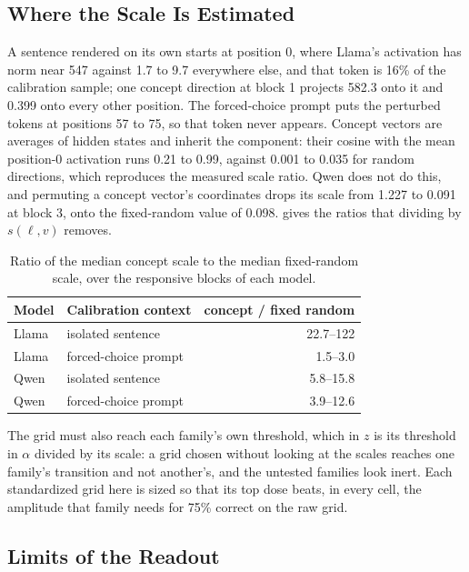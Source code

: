 \subsection{Where the Scale Is Estimated}
\label{app:loc-scale}

A sentence rendered on its own starts at position 0, where Llama's activation
has norm near 547 against 1.7 to 9.7 everywhere else, and that token is 16\%
of the calibration sample; one concept direction at block 1 projects 582.3
onto it and 0.399 onto every other position. The forced-choice prompt puts the
perturbed tokens at positions 57 to 75, so that token never appears. Concept
vectors are averages of hidden states and inherit the component: their cosine
with the mean position-0 activation runs 0.21 to 0.99, against 0.001 to 0.035
for random directions, which reproduces the measured scale ratio. Qwen does
not do this, and permuting a concept vector's coordinates drops its scale from
1.227 to 0.091 at block 3, onto the fixed-random value of 0.098.
 gives the ratios that dividing by $s(\ell,v)$
removes.

\begin{table}[H]
\centering
\small
\begin{tabular}{llr}
\toprule
Model & Calibration context & concept / fixed random \\
\midrule
Llama & isolated sentence & 22.7--122 \\
Llama & forced-choice prompt & 1.5--3.0 \\
Qwen  & isolated sentence & 5.8--15.8 \\
Qwen  & forced-choice prompt & 3.9--12.6 \\
\bottomrule
\end{tabular}
\caption{Ratio of the median concept scale to the median fixed-random scale,
over the responsive blocks of each model.}
\label{tab:app-loc-scales}
\end{table}

The grid must also reach each family's own threshold, which in $z$ is its
threshold in $\alpha$ divided by its scale: a grid chosen without looking at
the scales reaches one family's transition and not another's, and the untested
families look inert. Each standardized grid here is sized so that its top dose
beats, in every cell, the amplitude that family needs for 75\% correct on the
raw grid.

\subsection{Limits of the Readout}
\label{app:loc-thresholds}

